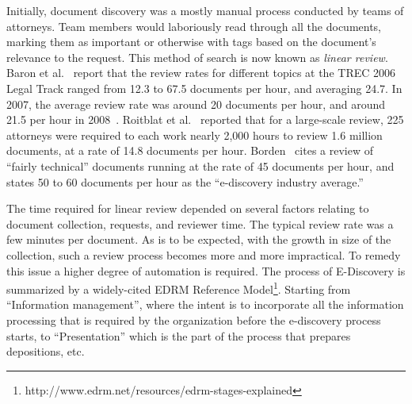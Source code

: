 \documentclass{sig-alternate-05-2015}
\theoremstyle{break}
\begin{document}

Initially, document discovery was a mostly manual process conducted by teams of attorneys. 
Team members would laboriously read through all the documents, marking them as important or otherwise with tags based on the document's relevance to the request. This method of search is now known as \textit{linear review}. 
Baron et al.~\cite{baron2006trec} report that the review rates for different topics at the TREC 2006 Legal Track ranged from 12.3 to 67.5 documents per hour, and averaging 24.7. In 2007, the average review rate was around 20 documents per hour, and around 21.5 per hour in 2008~\cite{oard08}. Roitblat et al.~\cite{roitblat} reported that for a large-scale review, 225 attorneys were required to each work nearly 2,000 hours to review 1.6 million documents, at a rate of 14.8 documents per hour. Borden~\cite{borden} cites a review of ``fairly technical'' documents running at the rate of 45 documents per hour, and states 50 to 60 documents per hour as the ``e-discovery industry average.''

The time required for linear  review depended on several factors relating to document
collection, requests, and reviewer time. The typical review rate was a few minutes per document. As is to be expected, with the growth in size of the collection, such a review process becomes more and more impractical. To remedy this issue a higher degree of automation is required.
The  process of E-Discovery is summarized  by a widely-cited EDRM Reference Model\footnote{http://www.edrm.net/resources/edrm-stages-explained}.  Starting from ``Information management'', where the intent is to incorporate all the information processing that is required by the organization before the e-discovery process starts, to ``Presentation'' which is
the part of the process that  prepares   depositions, etc. 
\end{document}
